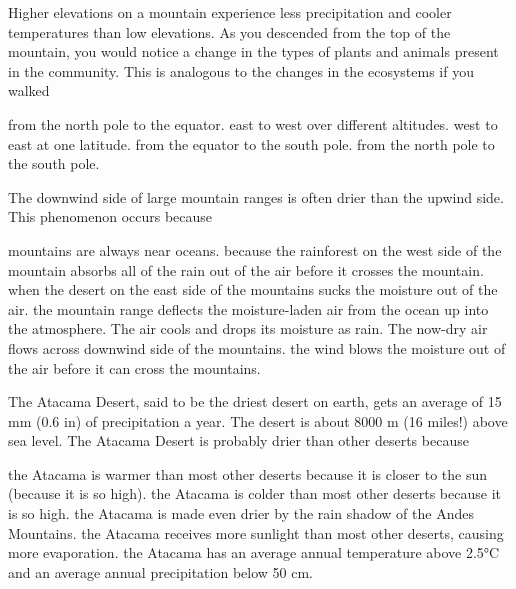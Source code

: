 \question
Higher elevations on a mountain experience less precipitation and cooler temperatures than low elevations.  As you descended from the top of the mountain, you would notice a change in the types of plants and animals present in the community.  This is analogous to the changes in the ecosystems if you walked 

\begin{choices}
\correctchoice from the north pole to the equator.%
\choice east to west over different altitudes.%
\choice west to east at one latitude.%
\choice from the equator to the south pole.%
\choice from the north pole to the south pole.%
\end{choices}



\question
The downwind side of large mountain ranges is often drier than the upwind side. This phenomenon occurs because

\begin{choices}
\choice mountains are always near oceans.%
\choice because the rainforest on the west side of the mountain absorbs all of the rain out of the air before it crosses the mountain.%
\choice when the desert on the east side of the mountains sucks the moisture out of the air.%
\correctchoice the mountain range deflects the moisture-laden air from the ocean up into the atmosphere. The air cools and drops its moisture as rain. The now-dry air flows across downwind side of the mountains.%
\choice the wind blows the moisture out of the air before it can cross the mountains.%
\end{choices}



\question
The Atacama Desert, said to be the driest desert on earth, gets an average of 15 mm (0.6 in) of precipitation a year.  The desert is about 8000 m (16 miles!) above sea level. The Atacama Desert is probably drier than other deserts because

\begin{choices}
\choice the Atacama is warmer than most other deserts because it is closer to the sun (because it is so high). %
\choice the Atacama is colder than most other deserts because it is so high. %
\correctchoice the Atacama is made even drier by the rain shadow of the Andes Mountains. %
\choice the Atacama receives more sunlight than most other deserts, causing more evaporation. %
\choice the Atacama has an average annual temperature above 2.5°C and an average annual precipitation below 50 cm. %
\end{choices}

